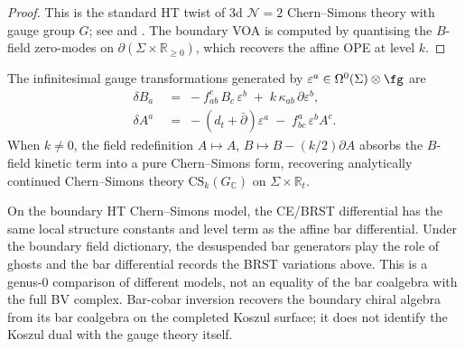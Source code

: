 \begin{proof}
This is the standard HT twist of 3d $\mathcal{N}=2$ Chern--Simons
theory with gauge group $G$; see \cite{Costello2013} and
\cite{CostelloGaiotto2020}. The boundary VOA is computed by
quantising the $B$-field zero-modes on $\partial(\Sigma \times
\mathbb{R}_{\ge 0})$, which recovers the affine OPE at level $k$.
\end{proof}

\begin{remark}
\label{rem:affine-cs-gauge}
The infinitesimal gauge transformations generated by
$\varepsilon^a \in \Omega^0(\Sigma) \otimes \fg$ are
\begin{align*}
 \delta B_a
 &\;=\;
 -f^c_{ab}\,B_c\,\varepsilon^b
 \;+\;
 k\,\kappa_{ab}\,\partial \varepsilon^b,
 \\
 \delta A^a
 &\;=\;
 -(d_t + \bar{\partial})\varepsilon^a
 \;-\;
 f^a_{bc}\,\varepsilon^b A^c.
\end{align*}
When $k \neq 0$, the field redefinition
$A \mapsto A$, $B \mapsto B - (k/2)\partial A$ absorbs the
$B$-field kinetic term into a pure Chern--Simons form, recovering
analytically continued Chern--Simons theory $\mathrm{CS}_k(G_\mathbb{C})$
on $\Sigma \times \mathbb{R}_t$.
\end{remark}

\begin{remark}
\label{rem:bar-as-brst-cs}
On the boundary HT Chern--Simons model, the CE/BRST differential has
the same local structure constants and level term as the affine bar
differential.  Under the boundary field dictionary, the desuspended bar
generators play the role of ghosts and the bar differential records the
BRST variations above.  This is a genus-$0$ comparison of different
models, not an equality of the bar coalgebra with the full BV complex.
Bar-cobar inversion recovers the boundary chiral algebra from its bar
coalgebra on the completed Koszul surface; it does not identify the
Koszul dual with the gauge theory itself.
\end{remark}

